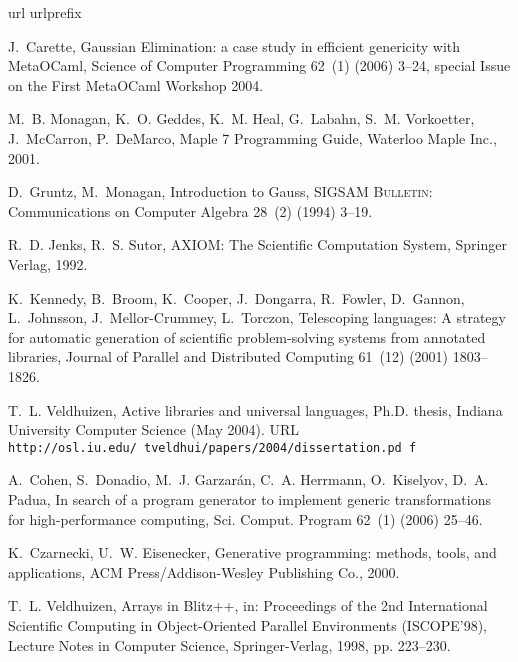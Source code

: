 \documentclass{elsart}
\begin{document}
% 
% 

\begin{thebibliography}{10}
\expandafter\ifx\csname url\endcsname\relax
  \def\url#1{\texttt{#1}}\fi
\expandafter\ifx\csname urlprefix\endcsname\relax\def\urlprefix{URL }\fi

J.~Carette, Gaussian {E}limination: a case study in efficient genericity with
  {MetaOCaml}, Science of Computer Programming 62~(1) (2006) 3--24, special
  Issue on the First MetaOCaml Workshop 2004.

M.~B. Monagan, K.~O. Geddes, K.~M. Heal, G.~Labahn, S.~M. Vorkoetter,
  J.~McCarron, P.~DeMarco, Maple 7 Programming Guide, Waterloo Maple Inc.,
  2001.

D.~Gruntz, M.~Monagan, Introduction to {Gauss}, \textsc{SIGSAM Bulletin}:
  Communications on Computer Algebra 28~(2) (1994) 3--19.

R.~D. Jenks, R.~S. Sutor, {AXIOM}: The Scientific Computation System, Springer
  Verlag, 1992.

K.~Kennedy, B.~Broom, K.~Cooper, J.~Dongarra, R.~Fowler, D.~Gannon,
  L.~Johnsson, J.~Mellor-Crummey, L.~Torczon, Telescoping languages: A strategy
  for automatic generation of scientific problem-solving systems from annotated
  libraries, Journal of Parallel and Distributed Computing 61~(12) (2001)
  1803--1826.

T.~L. Veldhuizen, Active libraries and universal languages, Ph.D. thesis,
  Indiana University Computer Science (May 2004).
\newline\urlprefix\url{http://osl.iu.edu/~tveldhui/papers/2004/dissertation.pd%
f}

A.~Cohen, S.~Donadio, M.~J. Garzar{\'a}n, C.~A. Herrmann, O.~Kiselyov, D.~A.
  Padua, In search of a program generator to implement generic transformations
  for high-performance computing, Sci. {C}omput. {P}rogram 62~(1) (2006)
  25--46.

K.~Czarnecki, U.~W. Eisenecker, Generative programming: methods, tools, and
  applications, ACM Press/Addison-Wesley Publishing Co., 2000.

T.~L. Veldhuizen, Arrays in {Blitz++}, in: Proceedings of the 2nd International
  Scientific Computing in Object-Oriented Parallel Environments (ISCOPE'98),
  Lecture Notes in Computer Science, Springer-Verlag, 1998, pp. 223--230.


\end{thebibliography}
\end{document}

